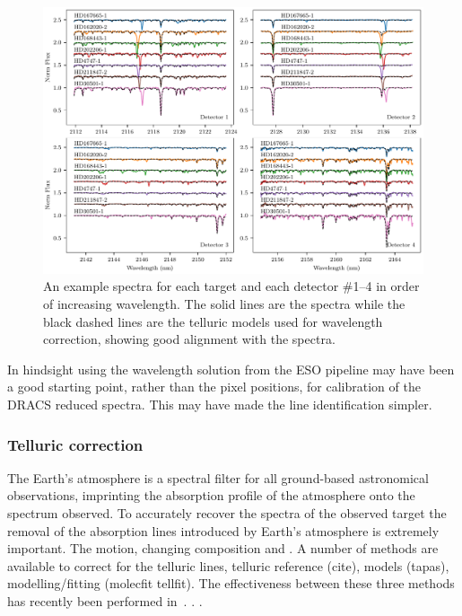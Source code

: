 \begin{figure}
    \centering
    \includegraphics[width=1\linewidth]{figures/reduction/Spectra_examples}
    \caption{An example spectra for each target and each detector \#1--4 in order of increasing wavelength.
The solid lines are the spectra while the black dashed lines are the telluric models used for wavelength correction, showing good alignment with the spectra.}
    \label{fig:spectraexamples}
\end{figure}




In hindsight using the wavelength solution from the {ESO} pipeline may have been a good starting point, rather than the pixel positions, for calibration of the {DRACS} reduced spectra.
This may have made the line identification simpler.


\subsubsection{Telluric correction}
\label{subsec:telluric_correction}
The Earth's atmosphere is a spectral filter for all ground-based astronomical observations, imprinting the absorption profile of the atmosphere onto the spectrum observed.
To accurately recover the spectra of the observed target the removal of the absorption lines introduced by Earth's atmosphere is extremely important.
The motion, changing composition and .
A number of methods are available to correct for the telluric lines, telluric reference (cite), models (tapas), modelling/fitting (molecfit tellfit).
The effectiveness between these three methods has recently been performed in~\cite{ulmer-moll_telluric_2018}. . .

